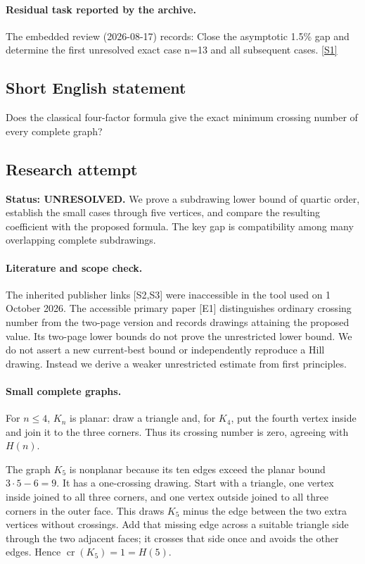 \documentclass[11pt,a4paper]{article}
\newcommand{\sref}[2]{\hyperlink{source:#1:#2}{[S#2]}}
\begin{document}
\paragraph{Residual task reported by the archive.}

The embedded review (2026-08-17) records: Close the asymptotic 1.5\% gap and determine the first unresolved exact case n=13 and all subsequent cases. \sref{1408}{1}

\subsection{Short English statement}

Does the classical four-factor formula give the exact minimum crossing number of every complete graph?

\subsection{Research attempt}
\textbf{Status: UNRESOLVED.} We prove a subdrawing lower bound of quartic order, establish the small cases through five vertices, and compare the resulting coefficient with the proposed formula. The key gap is compatibility among many overlapping complete subdrawings.

\paragraph{Literature and scope check.}
The inherited publisher links [S2,S3] were inaccessible in the tool used on 1 October 2026. The accessible primary paper [E1] distinguishes ordinary crossing number from the two-page version and records drawings attaining the proposed value. Its two-page lower bounds do not prove the unrestricted lower bound. We do not assert a new current-best bound or independently reproduce a Hill drawing. Instead we derive a weaker unrestricted estimate from first principles.

\paragraph{Small complete graphs.}
For $n\le4$, $K_n$ is planar: draw a triangle and, for $K_4$, put the fourth vertex inside and join it to the three corners. Thus its crossing number is zero, agreeing with $H(n)$.

The graph $K_5$ is nonplanar because its ten edges exceed the planar bound $3\cdot5-6=9$. It has a one-crossing drawing. Start with a triangle, one vertex inside joined to all three corners, and one vertex outside joined to all three corners in the outer face. This draws $K_5$ minus the edge between the two extra vertices without crossings. Add that missing edge across a suitable triangle side through the two adjacent faces; it crosses that side once and avoids the other edges. Hence $\operatorname{cr}(K_5)=1=H(5)$.
\end{document}
